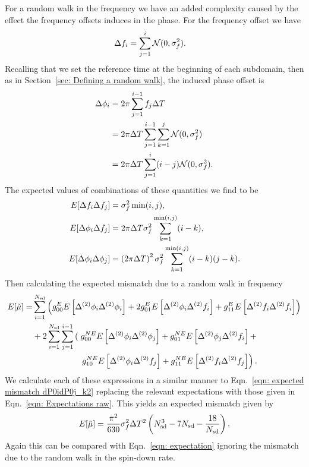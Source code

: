 For a random walk in the frequency we have an added complexity caused by the
effect the frequency offsets induces in the phase. For the frequency offset we
have
\begin{align}
\Delta f_{i} &= \sum_{j=1}^{i}\mathcal{N}(0, \sigma_{f}^{2}).
\end{align}
Recalling that we set the reference time at the beginning of each subdomain,
then as in Section~\ref{sec: Defining a random walk}, the induced phase offset is
\begin{align}
\Delta\phi_{i} &=2\pi \sum_{j=1}^{i-1}f_{j}\Delta T \\
 & = 2\pi\Delta T \sum_{j=1}^{i-1}\sum_{k=1}^{j}\mathcal{N}(0, \sigma_{f}^{2}) \\
& = 2\pi\Delta T \sum_{j=1}^{i}(i-j)\mathcal{N}(0, \sigma_{f}^{2}).
\end{align}
The expected values of combinations of these quantities we find to be
\begin{align}
E[\Delta f_{i}\Delta f_{j}] & = \sigma_{f}^{2} \min(i, j), \\
E[\Delta\phi_{i}\Delta f_{j}] & = 2 \pi \Delta T \sigma_{f}^{2} \sum_{k=1}^{\min(i, j)}(i-k),\\
E[\Delta\phi_{i}\Delta\phi_{j}] & =
\left(2\pi\Delta T\right)^{2}\sigma_{f}^{2} \sum_{k=1}^{\min(i, j)}(i-k)(j-k).
\label{eqn: Expectations raw}
\end{align}
Then calculating the expected mismatch due to a random walk in frequency
\begin{align}
\begin{split}
E[\mutilde] = &
\s{i=1}{\Nsd}\left(g_{00}^{E}E\left[\Delta^{(2)}\phi_{i}\Delta^{(2)}\phi_{i}\right]
+ 2 g_{01}^{E}E\left[\Delta^{(2)}\phi_{i}\Delta^{(2)}\f_{i}\right]
+  g_{11}^{E} E\left[\Delta^{(2)}\f_{i}\Delta^{(2)}\f_{i}\right] \right) \\
& + 2\s{i=1}{\Nsd}\s{j=1}{i-1}\left(\right.
g_{00}^{NE}E\left[\Delta^{(2)}\phi_{i}\Delta^{(2)}\phi_{j}\right] +
g_{01}^{NE}E\left[\Delta^{(2)}\phi_{j}\Delta^{(2)}\f_{i}\right] +  \\
&\hspace{20mm}\left. g_{10}^{NE}E\left[\Delta^{(2)}\phi_{i}\Delta^{(2)}\f_{j}\right] +
g_{11}^{NE} E\left[\Delta^{(2)}\f_{i}\Delta^{(2)}\f_{j}\right] \right).
\end{split}
\end{align}
We calculate each of these expressions in a similar manner to Eqn.~\eqref{eqn:
expected mismatch dP0idP0j_k2} replacing the relevant expectations with those
given in Eqn.~\eqref{eqn: Expectations raw}. This yields an expected
mismatch given by
\begin{equation}
E[\tilde{\mu}] = \frac{\pi^{2} }{630} \sigma_{f}^{2} \Delta T^{2}  \left(N_{\textrm{sd}}^{3} - 7N_{\textrm{sd}}- \frac{18}{N_{\textrm{sd}}} \right).
\label{eqn: Expected mismatch RW in frequency k2}
\end{equation}
Again this can be compared with Eqn.~\eqref{eqn: expectation} ignoring the
mismatch due to the random walk in the spin-down rate.

